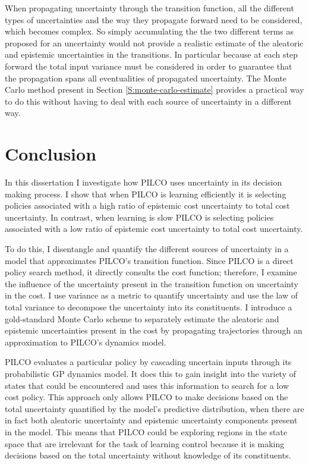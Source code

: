 When propagating uncertainty through the transition function, all the different types of uncertainties and the way they propagate forward need to be considered, which becomes complex. So simply accumulating the the two different terms as proposed for an uncertainty would not provide a realistic estimate of the aleatoric and epistemic uncertainties in the transitions. In particular because at each step forward the total input variance must be considered in order to guarantee that the propagation spans all eventualities of propagated uncertainty. The Monte Carlo method present in Section \ref{S:monte-carlo-estimate} provides a practical way to do this without having to deal with each source of uncertainty in a different way.

\section{Conclusion}
\label{S:conclusions}
In this dissertation I investigate how PILCO uses uncertainty in its decision making process. I show that when PILCO is learning efficiently it is selecting policies associated with a high ratio of epistemic cost uncertainty to total cost uncertainty. In contrast, when learning is slow PILCO is selecting policies associated with a low ratio of epistemic cost uncertainty to total cost uncertainty. 

To do this, I disentangle and quantify the different sources of uncertainty in a model that approximates PILCO's transition function. Since PILCO is a direct policy search method, it directly consults the cost function; therefore, I examine the influence of the uncertainty present in the transition function on uncertainty in the cost. I use variance as a metric to quantify uncertainty and use the law of total variance to decompose the uncertainty into its constituents. I introduce a gold-standard Monte Carlo scheme to separately estimate the aleatoric and epistemic uncertainties present in the cost by propagating trajectories through an approximation to PILCO's dynamics model. 

PILCO evaluates a particular policy by cascading uncertain inputs through its probabilistic GP dynamics model. It does this to gain insight into the variety of states that could be encountered and uses this information to search for a low cost policy. This approach only allows PILCO to make decisions based on the total uncertainty quantified by the model's predictive distribution, when there are in fact both aleatoric uncertainty and epistemic uncertainty components present in the model. This means that PILCO could be exploring regions in the state space that are irrelevant for the task of learning control because it is making decisions based on the total uncertainty without knowledge of its constituents. 

